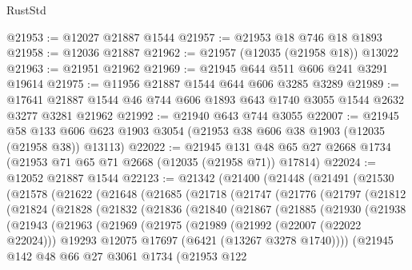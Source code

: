 \begin{lexlean}{RustStd}
\begin{coremodule}
@21953 := @12027 @21887 @1544
@21957 := @21953 @18 @746 @18 @1893
@21958 := @12036 @21887
@21962 := @21957 (@12035 (@21958 @18)) @13022
@21963 := @21951 @21962
@21969 := @21945 @644 @511 @606 @241 @3291 @19614
@21975 := @11956 @21887 @1544 @644 @606 @3285 @3289
@21989 := @17641 @21887 @1544 @46 @744 @606 @1893 @643 @1740 @3055 @1544 @2632 @3277 @3281 @21962
@21992 := @21940 @643 @744 @3055
@22007 := @21945
    @58
    @133
    @606
    @623
    @1903
    @3054
    (@21953 @38 @606 @38 @1903 (@12035 (@21958 @38)) @13113)
@22022 := @21945
    @131
    @48
    @65
    @27
    @2668
    @1734
    (@21953 @71 @65 @71 @2668 (@12035 (@21958 @71)) @17814)
@22024 := @12052 @21887 @1544
@22123 := @21342
    (@21400
      (@21448
        (@21491
          (@21530
            (@21578
              (@21622
                (@21648
                  (@21685
                    (@21718
                      (@21747
                        (@21776
                          (@21797
                            (@21812
                              (@21824
                                (@21828
                                  (@21832
                                    (@21836
                                      (@21840
                                        (@21867
                                          (@21885
                                            (@21930
                                              (@21938
                                                (@21943
                                                  (@21963
                                                    (@21969
                                                      (@21975
                                                        (@21989
                                                          (@21992 (@22007 (@22022 @22024)))
                                                          @19293
                                                          @12075
                                                          @17697
                                                          (@6421 (@13267 @3278 @1740))))
                                                      (@21945
                                                        @142
                                                        @48
                                                        @66
                                                        @27
                                                        @3061
                                                        @1734
                                                        (@21953
                                                          @122

\end{coremodule}
\end{lexlean}
